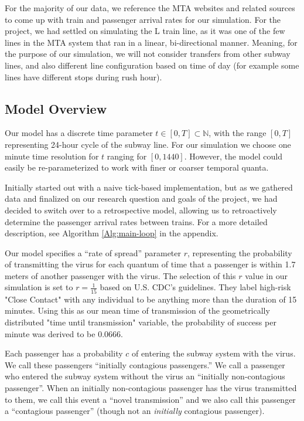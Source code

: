\documentclass[12pt]{article}
\begin{document}
For the majority of our data, we reference the MTA websites and related sources to come up with train and passenger arrival rates for our simulation.
For the project, we had settled on simulating the L train line, as it was one of the few lines in the MTA system that ran in a linear, bi-directional manner.
Meaning, for the purpose of our simulation, we will not consider transfers from other subway lines, and also different line configuration based on time of day (for example some lines have different stops during rush hour). 

\subsection{Model Overview}

Our model has a discrete time parameter $t \in [0, T] \subset \mathbb{N}$, with the range $[0, T]$ representing 24-hour cycle of the subway line.
For our simulation we choose one minute time resolution for $t$ ranging for $[0, 1440]$.
However, the model could easily be re-parameterized to work with finer or coarser temporal quanta.

Initially started out with a naive tick-based implementation, but as we gathered data and finalized on our research question and goals of the project, we had decided to switch over to a retrospective model, allowing us to retroactively determine the passenger arrival rates between trains. For a more detailed description, see Algorithm \ref{Alg:main-loop} in the appendix.

Our model specifies a ``rate of spread'' parameter $r$, representing the probability of transmitting the virus for each quantum of time that a passenger is within 1.7 meters of another passenger with the virus.
The selection of this $r$ value in our simulation is set to $r=\frac{1}{15}$ based on U.S. CDC's guidelines. They label high-risk "Close Contact" with any individual to be anything more than the duration of 15 minutes. Using this as our mean time of transmission of the geometrically distributed "time until transmission" variable, the probability of success per minute was derived to be $0.0666$.


Each passenger has a probability $c$ of entering the subway system with the virus.
We call these passengers ``initially contagious passengers.''
We call a passenger who entered the subway system without the virus an ``initially non-contagious passenger''.
When an initially non-contagious passenger has the virus transmitted to them, we call this event a ``novel transmission'' and we also call this passenger a ``contagious passenger'' (though not an \emph{initially} contagious passenger).
\end{document}
